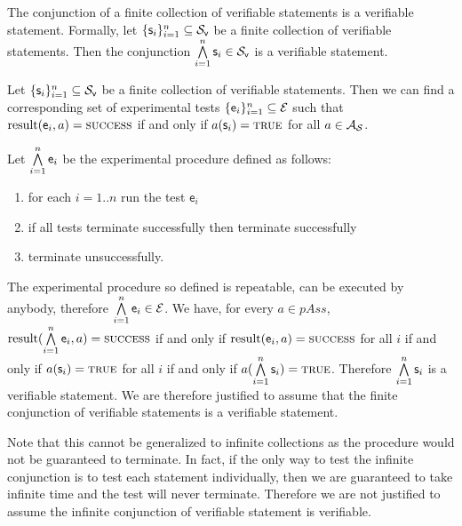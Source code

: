 \documentclass[11pt,letterpaper,fleqn]{memoir} %
\begin{document}
\begin{mathSection}
	\begin{axiom}\label{ax_verifiable_AND}
	The conjunction of a finite collection of verifiable statements is a verifiable statement. Formally, let $\{\mathsf{s}_i\}_{i=1}^{n} \subseteq \mathcal{S}_\textsf{v}$ be a finite collection of verifiable statements. Then the conjunction $\bigwedge\limits_{i=1}^{n} \mathsf{s}_i \in \mathcal{S}_\textsf{v}$ is a verifiable statement.
	\end{axiom}
	\begin{justification}
		Let $\{\mathsf{s}_i\}_{i=1}^{n} \subseteq \mathcal{S}_\textsf{v}$ be a finite collection of verifiable statements. Then we can find a corresponding set of experimental tests $\{\mathsf{e}_i\}_{i=1}^{n} \subseteq \mathcal{E}$ such that $\operatorname{result}(\mathsf{e}_i, a) = \textsc{success}$ if and only if $a(\mathsf{s}_i) = \textsc{true}$ for all $a \in \mathcal{A}_{\mathcal{S}}$.
		
		Let $\bigwedge\limits_{i=1}^{n} \mathsf{e}_i$ be the experimental procedure defined as follows:
		\begin{enumerate}
			\item for each $i=1..n$ run the test $\mathsf{e}_i$
			\item if all tests terminate successfully then terminate successfully
			\item terminate unsuccessfully.
		\end{enumerate}
		The experimental procedure so defined is repeatable, can be executed by anybody, therefore $\bigwedge\limits_{i=1}^{n} \mathsf{e}_i \in \mathcal{E}$. We have, for every $a \in pAss$, $\operatorname{result}(\bigwedge\limits_{i=1}^{n} \mathsf{e}_i, a) = \textsc{success}$ if and only if $\operatorname{result}(\mathsf{e}_i, a) = \textsc{success}$ for all $i$ if and only if $a(\mathsf{s}_i) = \textsc{true}$ for all $i$ if and only if $a(\bigwedge\limits_{i=1}^{n}\mathsf{s}_i) = \textsc{true}$. Therefore $\bigwedge\limits_{i=1}^{n}\mathsf{s}_i$ is a verifiable statement. We are therefore justified to assume that the finite conjunction of verifiable statements is a verifiable statement.
		
		Note that this cannot be generalized to infinite collections as the procedure would not be guaranteed to terminate. In fact, if the only way to test the infinite conjunction is to test each statement individually, then we are guaranteed to take infinite time and the test will never terminate. Therefore we are not justified to assume the infinite conjunction of verifiable statement is verifiable.
	\end{justification}
\end{mathSection}	
\end{document}
